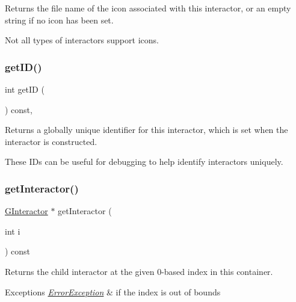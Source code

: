 Returns the file name of the icon associated with this interactor, or an empty string if no icon has been set. 

Not all types of interactors support icons. \mbox{\label{classGInteractor_a9c9659a6c6ba66b4107ba59c95a24241}} 
\subsubsection{\texorpdfstring{get\+I\+D()}{getID()}}
{\footnotesize\ttfamily int get\+ID (\begin{DoxyParamCaption}{ }\end{DoxyParamCaption}) const\hspace{0.3cm}{\ttfamily [virtual]}, {\ttfamily [inherited]}}



Returns a globally unique identifier for this interactor, which is set when the interactor is constructed. 

These I\+Ds can be useful for debugging to help identify interactors uniquely. \mbox{\label{classGContainer_ac59d7bae6154f6f8791c7f1fd856b157}} 
\subsubsection{\texorpdfstring{get\+Interactor()}{getInteractor()}}
{\footnotesize\ttfamily \mbox{\hyperlink{classGInteractor}{G\+Interactor}} $\ast$ get\+Interactor (\begin{DoxyParamCaption}\item[{int}]{i }\end{DoxyParamCaption}) const\hspace{0.3cm}{\ttfamily [virtual]}}



Returns the child interactor at the given 0-\/based index in this container. 


\begin{DoxyExceptions}{Exceptions}
{\em \mbox{\hyperlink{classErrorException}{Error\+Exception}}} & if the index is out of bounds \\
\hline
\end{DoxyExceptions}
\mbox{\label{classGContainer_ad31230cd6d220466fbd18fd21d133f67}} 
